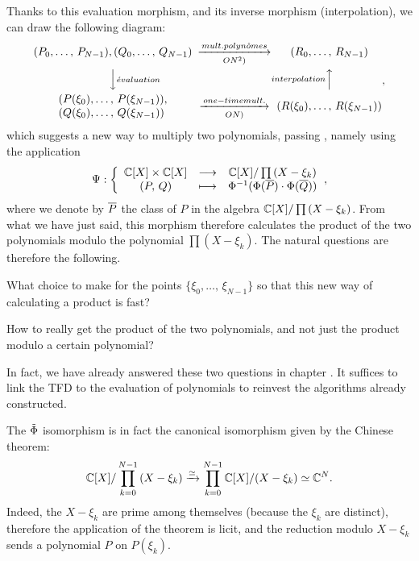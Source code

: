  
Thanks to this evaluation morphism, and its inverse morphism (interpolation), we can draw the following diagram:
\begin{equation*}
\begin{CD} (P_0, \ldots, \, P_{N-1}), (Q_0, \ldots, \, Q_{N-1}) @> mult.polyn \hat{o} mes> \grdo (N^2)> (R_0, \ldots, \, R_{N-1}) \\@VV{\acute{e} valuation} V @A{interpolation} AA \\\begin{array}{l} (P (\xi_0), \ldots, \, P (\xi_{N-1})), \\(Q (\xi_0), \ldots, \, Q (\xi_{N-1})) \end{array} @>{one-time mult.}>{\grdo (N)}> (R (\xi_0), \ldots, \, R (\xi_{N-1})) \end{CD},
\end{equation*}
which suggests a new way to multiply two polynomials, passing , namely using the application
\begin{equation*}
\Psi: {\left\{ \begin{array}{ccc} \mathbb{C} [X] \times \mathbb{C} [X] & \longrightarrow & \mathbb{C} [X] / \prod{(X- \xi_k)} \\ (P, \, Q) & \longmapsto & \Phi^{-1} (\Phi (\overline{P}) \cdot \Phi (\overline{Q})) \end{array} \right.},
\end{equation*}
where we denote by $ \overline{P} $ the class of $ P $ in the algebra $ \mathbb{C} [X] / \prod{(X- \xi_k)} $. From what we have just said, this morphism therefore calculates the product of the two polynomials modulo the polynomial $ \prod{(X- \xi_k)} $. The natural questions are therefore the following. \begin{rs}
\item What choice to make for the points $ \{\xi_0, \ldots, \, \xi_{N-1} \} $ so that this new way of calculating a product is fast?
\item How to really get the product of the two polynomials, and not just the product modulo a certain polynomial?
\end{rs} In fact, we have already answered these two questions in chapter . It suffices to link the TFD to the evaluation of polynomials to reinvest the algorithms already constructed.
 
\begin{rem}
 The $ \tilde{\Phi} $ isomorphism is in fact the canonical isomorphism given by the Chinese theorem:
\begin{equation*}
\mathbb{C} [X] / \prod_{k = 0}^{N-1}{(X- \xi_k)} \xrightarrow{\simeq} \prod_{k = 0}^{N-1}{\mathbb{C} [ X] / (X- \xi_k)} \simeq \mathbb{C}^N.
\end{equation*}
Indeed, the $ X- \xi_k $ are prime among themselves (because the $ \xi_k $ are distinct), therefore the application of the theorem is licit, and the reduction modulo $ X- \xi_k $ sends a polynomial $ P $ on $ P (\xi_k) $.
\end{rem}
 
